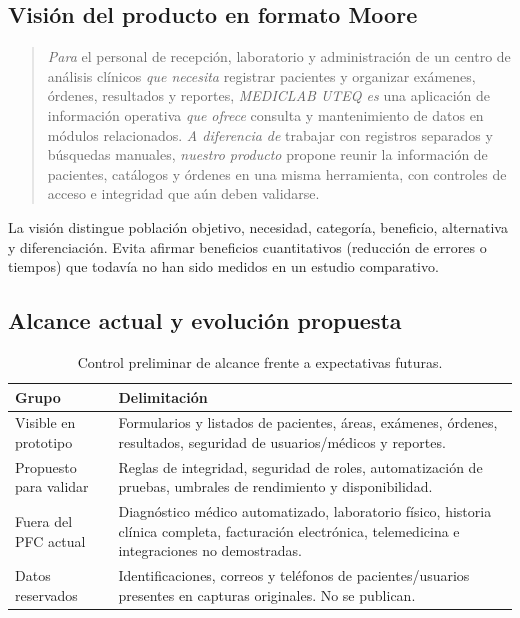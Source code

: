\subsection{Visión del producto en formato Moore}
\begin{quote}
\small\textit{Para} el personal de recepción, laboratorio y administración de un centro de análisis clínicos \textit{que necesita} registrar pacientes y organizar exámenes, órdenes, resultados y reportes, \textit{MEDICLAB UTEQ es} una aplicación de información operativa \textit{que ofrece} consulta y mantenimiento de datos en módulos relacionados. \textit{A diferencia de} trabajar con registros separados y búsquedas manuales, \textit{nuestro producto} propone reunir la información de pacientes, catálogos y órdenes en una misma herramienta, con controles de acceso e integridad que aún deben validarse.
\end{quote}
La visión distingue población objetivo, necesidad, categoría, beneficio, alternativa y diferenciación. Evita afirmar beneficios cuantitativos (reducción de errores o tiempos) que todavía no han sido medidos en un estudio comparativo.

\subsection{Alcance actual y evolución propuesta}
\begin{table}[H]\centering\small
\caption{Control preliminar de alcance frente a expectativas futuras.}\label{tab:alcance}
\begin{tabularx}{\linewidth}{@{}p{3cm}X@{}}\toprule
\textbf{Grupo} & \textbf{Delimitación}\\\midrule
Visible en prototipo & Formularios y listados de pacientes, áreas, exámenes, órdenes, resultados, seguridad de usuarios/médicos y reportes.\\
Propuesto para validar & Reglas de integridad, seguridad de roles, automatización de pruebas, umbrales de rendimiento y disponibilidad.\\
Fuera del PFC actual & Diagnóstico médico automatizado, laboratorio físico, historia clínica completa, facturación electrónica, telemedicina e integraciones no demostradas.\\
Datos reservados & Identificaciones, correos y teléfonos de pacientes/usuarios presentes en capturas originales. No se publican.\\\bottomrule
\end{tabularx}
\end{table}

